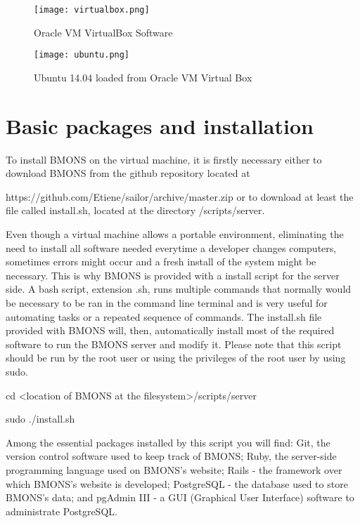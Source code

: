 \clearpage
\begin{figure}[h]
\centering\texttt{[image: virtualbox.png]}
\caption{\label{fig:virtualbox} Oracle VM VirtualBox Software}
\end{figure}

\begin{figure}[h]
\centering\texttt{[image: ubuntu.png]}
\caption{\label{fig:ubuntu} Ubuntu 14.04 loaded from Oracle VM Virtual Box}
\end{figure}

\clearpage

\section{Basic packages and installation}

To install BMONS on the virtual machine, it is firstly necessary either to download BMONS from the github repository located at 

https://github.com/Etiene/sailor/archive/master.zip or to download at least the file called install.sh, located at the directory /scripts/server.


Even though a virtual machine allows a portable environment, eliminating the need to install all software needed everytime a developer changes computers, sometimes errors might occur and a fresh install of the system might be necessary. This is why BMONS is provided with a install script for the server side. A bash script, extension .sh, runs multiple commands that normally would be necessary to be ran in the command line terminal and is very useful for automating tasks or a repeated sequence of commands. The install.sh file provided with BMONS will, then, automatically install most of the required software to run the BMONS server and modify it. Please note that this script should be run by the root user or using the privileges of the root user by using sudo.



\indent\indent cd <location of BMONS at the filesystem>/scripts/server

\indent\indent sudo ./install.sh



Among the essential packages installed by this script you will find: Git, the version control software used to keep track of BMONS; Ruby, the server-side programming language used on BMONS's website; Rails - the framework over which BMONS's website is developed; PostgreSQL - the database used to store BMONS's data; and pgAdmin III - a GUI (Graphical User Interface) software to administrate PostgreSQL.


